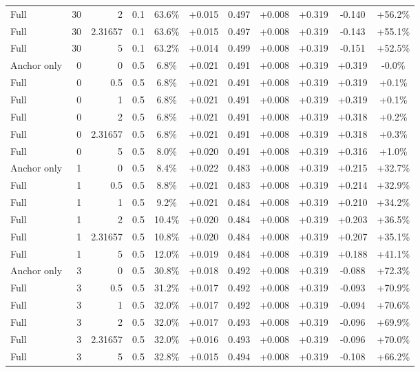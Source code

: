 \begin{table}[htbp]
\begin{tabular}{lrrrccccccc}
Full & 30 & 2 & 0.1 & 63.6\% & +0.015 & 0.497 & +0.008 & +0.319 & -0.140 & +56.2\% \\
Full & 30 & 2.31657 & 0.1 & 63.6\% & +0.015 & 0.497 & +0.008 & +0.319 & -0.143 & +55.1\% \\
Full & 30 & 5 & 0.1 & 63.2\% & +0.014 & 0.499 & +0.008 & +0.319 & -0.151 & +52.5\% \\
Anchor only & 0 & 0 & 0.5 & 6.8\% & +0.021 & 0.491 & +0.008 & +0.319 & +0.319 & -0.0\% \\
Full & 0 & 0.5 & 0.5 & 6.8\% & +0.021 & 0.491 & +0.008 & +0.319 & +0.319 & +0.1\% \\
Full & 0 & 1 & 0.5 & 6.8\% & +0.021 & 0.491 & +0.008 & +0.319 & +0.319 & +0.1\% \\
Full & 0 & 2 & 0.5 & 6.8\% & +0.021 & 0.491 & +0.008 & +0.319 & +0.318 & +0.2\% \\
Full & 0 & 2.31657 & 0.5 & 6.8\% & +0.021 & 0.491 & +0.008 & +0.319 & +0.318 & +0.3\% \\
Full & 0 & 5 & 0.5 & 8.0\% & +0.020 & 0.491 & +0.008 & +0.319 & +0.316 & +1.0\% \\
Anchor only & 1 & 0 & 0.5 & 8.4\% & +0.022 & 0.483 & +0.008 & +0.319 & +0.215 & +32.7\% \\
Full & 1 & 0.5 & 0.5 & 8.8\% & +0.021 & 0.483 & +0.008 & +0.319 & +0.214 & +32.9\% \\
Full & 1 & 1 & 0.5 & 9.2\% & +0.021 & 0.484 & +0.008 & +0.319 & +0.210 & +34.2\% \\
Full & 1 & 2 & 0.5 & 10.4\% & +0.020 & 0.484 & +0.008 & +0.319 & +0.203 & +36.5\% \\
Full & 1 & 2.31657 & 0.5 & 10.8\% & +0.020 & 0.484 & +0.008 & +0.319 & +0.207 & +35.1\% \\
Full & 1 & 5 & 0.5 & 12.0\% & +0.019 & 0.484 & +0.008 & +0.319 & +0.188 & +41.1\% \\
Anchor only & 3 & 0 & 0.5 & 30.8\% & +0.018 & 0.492 & +0.008 & +0.319 & -0.088 & +72.3\% \\
Full & 3 & 0.5 & 0.5 & 31.2\% & +0.017 & 0.492 & +0.008 & +0.319 & -0.093 & +70.9\% \\
Full & 3 & 1 & 0.5 & 32.0\% & +0.017 & 0.492 & +0.008 & +0.319 & -0.094 & +70.6\% \\
Full & 3 & 2 & 0.5 & 32.0\% & +0.017 & 0.493 & +0.008 & +0.319 & -0.096 & +69.9\% \\
Full & 3 & 2.31657 & 0.5 & 32.0\% & +0.016 & 0.493 & +0.008 & +0.319 & -0.096 & +70.0\% \\
Full & 3 & 5 & 0.5 & 32.8\% & +0.015 & 0.494 & +0.008 & +0.319 & -0.108 & +66.2\% \\

\end{tabular}
\end{table}
